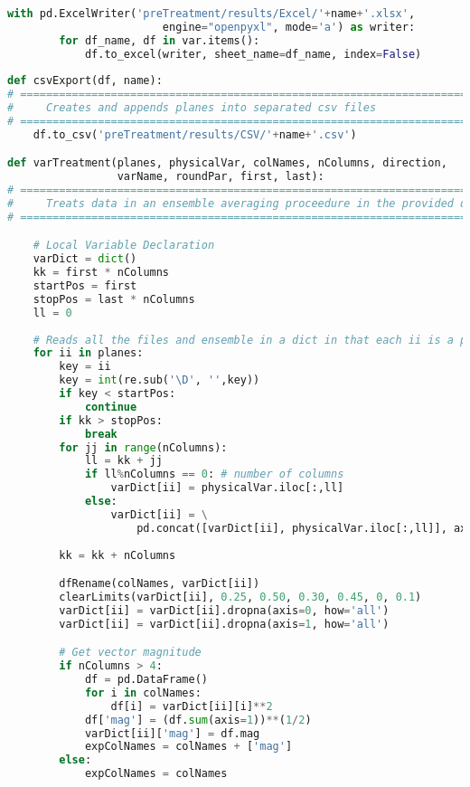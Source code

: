 \begin{lstlisting}[language=python]
    with pd.ExcelWriter('preTreatment/results/Excel/'+name+'.xlsx',
                        engine="openpyxl", mode='a') as writer:
        for df_name, df in var.items():
            df.to_excel(writer, sheet_name=df_name, index=False)
            
def csvExport(df, name):
# =============================================================================
#     Creates and appends planes into separated csv files
# =============================================================================
    df.to_csv('preTreatment/results/CSV/'+name+'.csv')

def varTreatment(planes, physicalVar, colNames, nColumns, direction,
                 varName, roundPar, first, last):
# =============================================================================
#     Treats data in an ensemble averaging proceedure in the provided direction
# =============================================================================

    # Local Variable Declaration
    varDict = dict()
    kk = first * nColumns
    startPos = first
    stopPos = last * nColumns
    ll = 0
  
    # Reads all the files and ensemble in a dict in that each ii is a plane
    for ii in planes:
        key = ii
        key = int(re.sub('\D', '',key))
        if key < startPos:
            continue
        if kk > stopPos: 
            break
        for jj in range(nColumns):
            ll = kk + jj
            if ll%nColumns == 0: # number of columns
                varDict[ii] = physicalVar.iloc[:,ll]
            else:
                varDict[ii] = \
                    pd.concat([varDict[ii], physicalVar.iloc[:,ll]], axis=1)
                    
        kk = kk + nColumns

        dfRename(colNames, varDict[ii])
        clearLimits(varDict[ii], 0.25, 0.50, 0.30, 0.45, 0, 0.1)
        varDict[ii] = varDict[ii].dropna(axis=0, how='all')
        varDict[ii] = varDict[ii].dropna(axis=1, how='all')

        # Get vector magnitude
        if nColumns > 4:
            df = pd.DataFrame()
            for i in colNames:
                df[i] = varDict[ii][i]**2
            df['mag'] = (df.sum(axis=1))**(1/2)
            varDict[ii]['mag'] = df.mag
            expColNames = colNames + ['mag']
        else:
            expColNames = colNames
            

\end{lstlisting}
